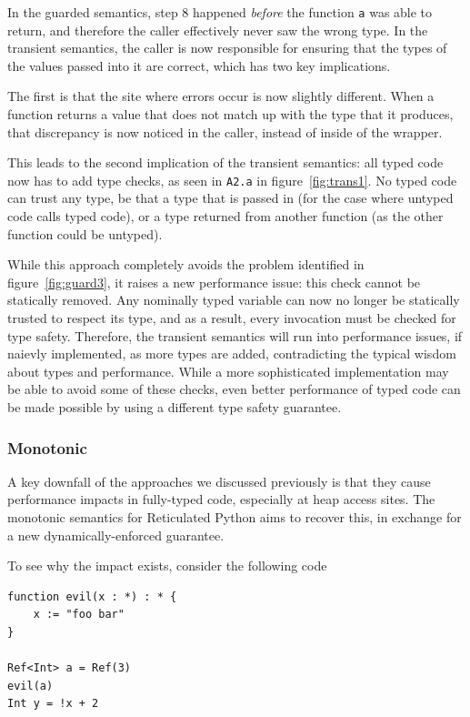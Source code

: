 \documentclass[a4paper,USenglish]{tex/lipics-v2016}
\begin{document}
In the guarded semantics, step 8 happened \emph{before} the function
\verb|a| was able to return, and therefore the caller effectively never saw
the wrong type. In the transient semantics, the caller is now responsible
for ensuring that the types of the values passed into it are correct, which
has two key implications.

The first is that the site where errors occur is now slightly
different. When a function returns a value that does not match up with the
type that it produces, that discrepancy is now noticed in the caller,
instead of inside of the wrapper.

This leads to the second implication of the transient semantics: all typed
code now has to add type checks, as seen in \verb|A2.a| in
figure~\ref{fig:trans1}. No typed code can trust any type, be that a type
that is passed in (for the case where untyped code calls typed code), or a
type returned from another function (as the other function could be
untyped).

While this approach completely avoids the problem identified in
figure~\ref{fig:guard3}, it raises a new performance issue: this check
cannot be statically removed. Any nominally typed variable can now no longer
be statically trusted to respect its type, and as a result, every invocation
must be checked for type safety. Therefore, the transient semantics will run
into performance issues, if naievly implemented, as more types are added,
contradicting the typical wisdom about types and performance. While a more
sophisticated implementation may be able to avoid some of these checks, even
better performance of typed code can be made possible by using a different
type safety guarantee.

\subsubsection{Monotonic}
A key downfall of the approaches we discussed previously is that they
cause performance impacts in fully-typed code, especially at heap access
sites. The monotonic semantics for Reticulated Python aims to recover this,
in exchange for a new dynamically-enforced guarantee.

To see why the impact exists, consider the following code

\begin{verbatim}
function evil(x : *) : * {
	x := "foo bar"
}

Ref<Int> a = Ref(3)
evil(a)
Int y = !x + 2
\end{verbatim}
\end{document}
